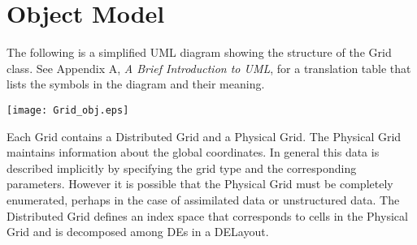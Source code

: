 %

\pagebreak
\section{Object Model}

The following is a simplified UML diagram showing the structure of the
Grid class.  See Appendix A, {\it A Brief Introduction to UML},
for a translation table that lists the symbols in the diagram and their 
meaning.

\begin{center}
\texttt{[image: Grid\_obj.eps]}   
\end{center}

Each Grid contains a Distributed Grid and a Physical Grid. The Physical Grid
maintains information about the global coordinates. In general this data is
described implicitly by specifying the grid type and the corresponding
parameters. However it is possible that the Physical Grid must be completely
enumerated, perhaps in the case of assimilated data or unstructured data. The
Distributed Grid defines an index space that corresponds to cells in 
the Physical
Grid and is decomposed among DEs in a DELayout.


